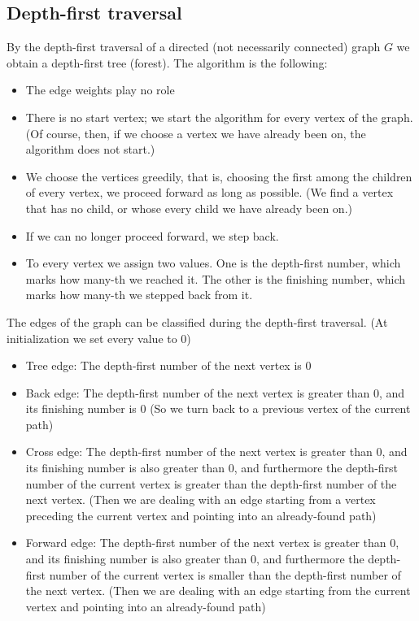 \documentclass[margin=0px]{article}
\begin{document}
\subsection{Depth-first traversal}
By the depth-first traversal of a directed (not necessarily connected) graph $G$ we obtain a depth-first tree (forest). The algorithm is the following:
\begin{itemize}
    \item The edge weights play no role
    \item There is no start vertex; we start the algorithm for every vertex of the graph. (Of course, then, if we choose a vertex we have already been on, the algorithm does not start.)
    \item We choose the vertices greedily, that is, choosing the first among the children of every vertex, we proceed forward as long as possible. (We find a vertex that has no child, or whose every child we have already been on.)
    \item If we can no longer proceed forward, we step back.
    \item To every vertex we assign two values. One is the depth-first number, which marks how many-th we reached it. The other is the finishing number, which marks how many-th we stepped back from it.
\end{itemize}
The edges of the graph can be classified during the depth-first traversal. (At initialization we set every value to 0)
\begin{itemize}
    \item Tree edge: The depth-first number of the next vertex is 0
    \item Back edge: The depth-first number of the next vertex is greater than 0, and its finishing number is 0 (So we turn back to a previous vertex of the current path)
    \item Cross edge: The depth-first number of the next vertex is greater than 0, and its finishing number is also greater than 0, and furthermore the depth-first number of the current vertex is greater than the depth-first number of the next vertex. (Then we are dealing with an edge starting from a vertex preceding the current vertex and pointing into an already-found path)
    \item Forward edge: The depth-first number of the next vertex is greater than 0, and its finishing number is also greater than 0, and furthermore the depth-first number of the current vertex is smaller than the depth-first number of the next vertex. (Then we are dealing with an edge starting from the current vertex and pointing into an already-found path)
\end{itemize}
\end{document}

